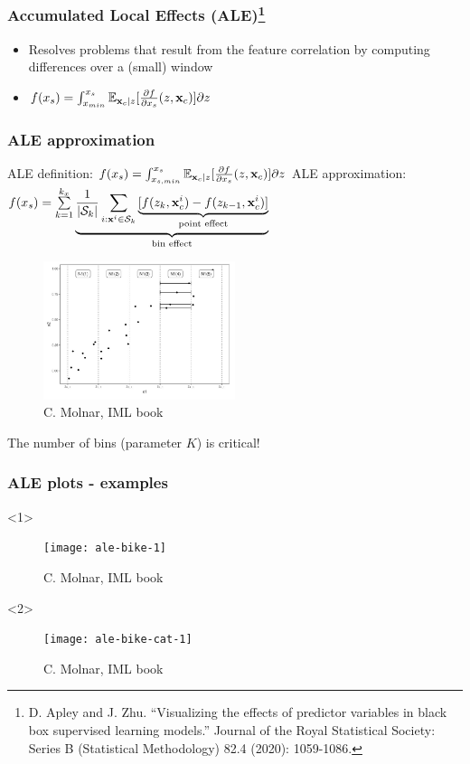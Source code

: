 \begin{frame}
  \frametitle{Accumulated Local Effects (ALE)\footnote{D. Apley and
    J. Zhu. ``Visualizing the effects of predictor variables in black box
    supervised learning models.'' Journal of the Royal Statistical Society:
    Series B (Statistical Methodology) 82.4 (2020): 1059-1086.}}

  \begin{itemize}
  \item Resolves problems that result from the feature correlation by computing
    differences over a (small) window
  \item \(f(x_s) = \int_{x_{min}}^{x_s}\mathbb{E}_{\mathbf{x}_c|z}[ \frac{\partial f}{\partial x_s}(z, \mathbf{x}_c)] \partial z\)
  \end{itemize}
\end{frame}

\begin{frame}
  \frametitle{ALE approximation}
  ALE definition: \( f(x_s) = \int_{x_{s, min}}^{x_s}\mathbb{E}_{\mathbf{x}_c|z}[ \frac{\partial f}{\partial x_s}(z, \mathbf{x}_c)] \partial z \)
  ALE approximation: \(f(x_s) = \sum\limits_{k=1}^{k_x}
  \underbrace{\frac{1}{|\mathcal{S}_k|} \sum_{i:\mathbf{x}^i \in \mathcal{S}_k}
    \underbrace{[f(z_k, \mathbf{x}^i_c) - f(z_{k-1}, \mathbf{x}^i_c)]}_{\text{point
        effect}}}_{\text{bin effect}} \) 

  \begin{figure}[ht]
    \centering
    \includegraphics[width=0.5\textwidth]{./figures/ale_bins_iml.png}
    \caption{\footnotesize C. Molnar, IML book}
  \end{figure}

  \noindent\makebox[\linewidth]{\rule{\paperwidth}{0.4pt}}
  The number of bins (parameter \(K\)) is critical!
\end{frame}

\begin{frame}
  \frametitle{ALE plots - examples}
  \begin{onlyenv}<1>
    \begin{figure}
      \texttt{[image: ale-bike-1]}
      \caption{\footnotesize C. Molnar, IML book}
    \end{figure}
  \end{onlyenv}
  \begin{onlyenv}<2>
    \begin{figure}
      \texttt{[image: ale-bike-cat-1]}
      \caption{\footnotesize C. Molnar, IML book}
    \end{figure}
  \end{onlyenv}
\end{frame}

